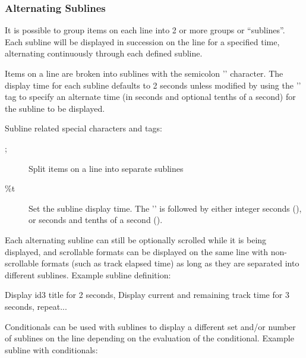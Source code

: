 \subsubsection{\label{ref:AlternatingSublines}Alternating Sublines}

It is possible to group items on each line into 2 or more groups or 
``sublines''. Each subline will be displayed in succession on the line for a 
specified time, alternating continuously through each defined subline.

Items on a line are broken into sublines with the semicolon
'\config{;}' character. The display time for
each subline defaults to 2 seconds unless modified by using the
'' tag to specify an alternate
time (in seconds and optional tenths of a second) for the subline to be
displayed. 

Subline related special characters and tags: 
\begin{description}
\item[;] Split items on a line into separate sublines
\item[\%t] Set the subline display time. The
'' is followed by either integer
seconds (), or seconds and tenths of a second ().
\end{description}

Each alternating subline can still be optionally scrolled while it is
being displayed, and scrollable formats can be displayed on the same
line with non{}-scrollable formats (such as track elapsed time) as long
as they are separated into different sublines.
Example subline definition:
\begin{example}
                                 Display id3 title for 2 seconds,
                                 Display current and remaining track time
                                 for 3 seconds,
                                 repeat...
\end{example}

Conditionals can be used with sublines to display a different set and/or number
of sublines on the line depending on the evaluation of the conditional.
Example subline with conditionals:
\begin{example}
\end{example}


